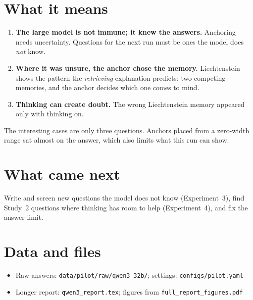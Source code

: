 \documentclass[11pt,a4paper]{article}
\begin{document}
\section{What it means}
\begin{enumerate}[leftmargin=*]
  \item \textbf{The large model is not immune; it knew the answers.} Anchoring needs uncertainty. Questions for the next run must be ones the model does \emph{not} know.
  \item \textbf{Where it was unsure, the anchor chose the memory.} Liechtenstein shows the pattern the \emph{retrieving} explanation predicts: two competing memories, and the anchor decides which one comes to mind.
  \item \textbf{Thinking can create doubt.} The wrong Liechtenstein memory appeared only with thinking on.
\end{enumerate}

\begin{cautionbox}[Limits.]
The interesting cases are only three questions. Anchors placed from a zero-width range sat almost on the answer, which also limits what this run can show.
\end{cautionbox}

\section{What came next}
Write and screen new questions the model does not know (Experiment~3), find Study~2 questions where thinking has room to help (Experiment~4), and fix the answer limit.

\appendix
\section{Data and files}
\begin{itemize}[leftmargin=*]
  \item Raw answers: \texttt{data/pilot/raw/qwen3-32b/}; settings: \texttt{configs/pilot.yaml}
  \item Longer report: \texttt{qwen3\_report.tex}; figures from \texttt{full\_report\_figures.pdf}
\end{itemize}



\end{document}
